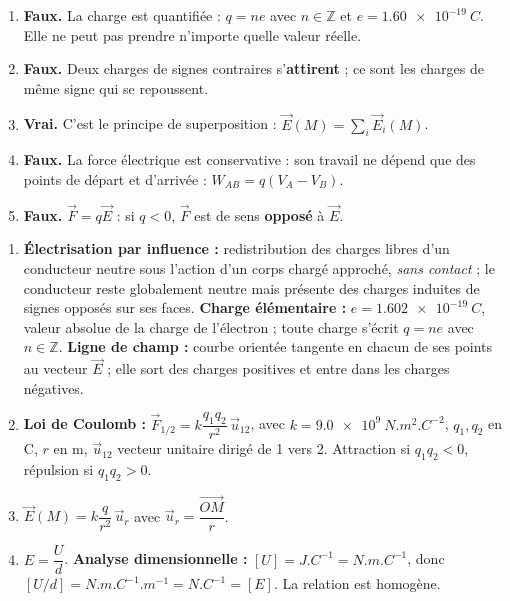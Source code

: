 \documentclass[11pt]{article}
\newcommand{\cle}[1]{{\popxbold\color{popdark}#1}}
\begin{document}
\begin{corrige}
\begin{enumerate}
\item \textbf{Faux.} La charge est \cle{quantifiée} : $q = n e$ avec $n \in \mathbb{Z}$ et $e = \SI{1,60e-19}{C}$. Elle ne peut pas prendre n'importe quelle valeur réelle.
\item \textbf{Faux.} Deux charges de signes contraires s'\textbf{attirent} ; ce sont les charges de même signe qui se repoussent.
\item \textbf{Vrai.} C'est le \cle{principe de superposition} : $\vec{E}(M) = \sum_i \vec{E}_i(M)$.
\item \textbf{Faux.} La force électrique est \cle{conservative} : son travail ne dépend que des points de départ et d'arrivée : $W_{AB} = q(V_A - V_B)$.
\item \textbf{Faux.} $\vec{F} = q\vec{E}$ : si $q < 0$, $\vec{F}$ est de sens \textbf{opposé} à $\vec{E}$.
\end{enumerate}
\end{corrige}

\begin{corrige}
\begin{enumerate}
\item \textbf{Électrisation par influence :} redistribution des charges libres d'un conducteur neutre sous l'action d'un corps chargé approché, \emph{sans contact} ; le conducteur reste globalement neutre mais présente des charges induites de signes opposés sur ses faces.
\textbf{Charge élémentaire :} $e = \SI{1,602e-19}{C}$, valeur absolue de la charge de l'électron ; toute charge s'écrit $q = n e$ avec $n \in \mathbb{Z}$.
\textbf{Ligne de champ :} courbe orientée tangente en chacun de ses points au vecteur $\vec{E}$ ; elle sort des charges positives et entre dans les charges négatives.
\item \textbf{Loi de Coulomb :} $\vec{F}_{1/2} = k\dfrac{q_1 q_2}{r^2}\,\vec{u}_{12}$, avec $k = \SI{9,0e9}{N.m^2.C^{-2}}$, $q_1, q_2$ en \si{C}, $r$ en \si{m}, $\vec{u}_{12}$ vecteur unitaire dirigé de 1 vers 2. Attraction si $q_1 q_2 < 0$, répulsion si $q_1 q_2 > 0$.
\item $\vec{E}(M) = k\dfrac{q}{r^2}\,\vec{u}_r$ avec $\vec{u}_r = \dfrac{\overrightarrow{OM}}{r}$.
\item $E = \dfrac{U}{d}$. \textbf{Analyse dimensionnelle :} $[U] = \si{J.C^{-1}} = \si{N.m.C^{-1}}$, donc $[U/d] = \si{N.m.C^{-1}.m^{-1}} = \si{N.C^{-1}} = [E]$. La relation est homogène.
\end{enumerate}
\end{corrige}
\end{document}
